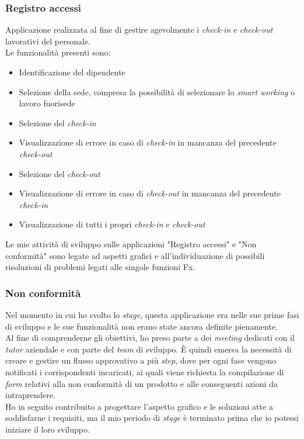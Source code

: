 \subsubsection*{Registro accessi}
Applicazione realizzata al fine di gestire agevolmente i \emph{check-in} e \emph{check-out} lavorativi del personale.\\
Le funzionalità presenti sono: 
\begin{itemize}
    \item Identificazione del dipendente
    \item Selezione della sede, compresa la possibilità di selezionare lo \emph{smart working} o lavoro fuorisede 
    \item Selezione del \emph{check-in} 
    \item Visualizzazione di errore in caso di \emph{check-in} in mancanza del precedente \emph{check-out} 
    \item Selezione del \emph{check-out} 
    \item Visualizzazione di errore in caso di \emph{check-out} in mancanza del precedente \emph{check-in} 
    \item Visualizzazione di tutti i propri \emph{check-in} e \emph{check-out} 
\end{itemize}

Le mie attività di sviluppo sulle applicazioni "Registro accessi" e "Non conformità" sono legate ad aspetti grafici e all'individuazione di possibili risoluzioni di problemi legati alle singole funzioni Fx. 

\subsubsection*{Non conformità}
Nel momento in cui ho svolto lo \emph{stage}, questa applicazione era nelle sue prime fasi di sviluppo e le sue funzionalità non erano state ancora definite pienamente.\\
Al fine di comprenderne gli obiettivi, ho preso parte a dei \emph{meeting} dedicati con il \emph{tutor} aziendale e con parte del \emph{team} di sviluppo. 
È quindi emersa la necessità di creare e gestire un flusso approvativo a più \emph{step}, dove per ogni fase vengono notificati i corrispondenti incaricati, ai quali viene richiesta la compilazione di \emph{form} relativi alla non conformità di un prodotto e alle conseguenti azioni da intraprendere.\\
Ho in seguito contribuito a progettare l'aspetto grafico e le soluzioni atte a soddisfarne i requisiti, ma il mio periodo di \emph{stage} è terminato prima che io potessi iniziare il loro sviluppo.  


